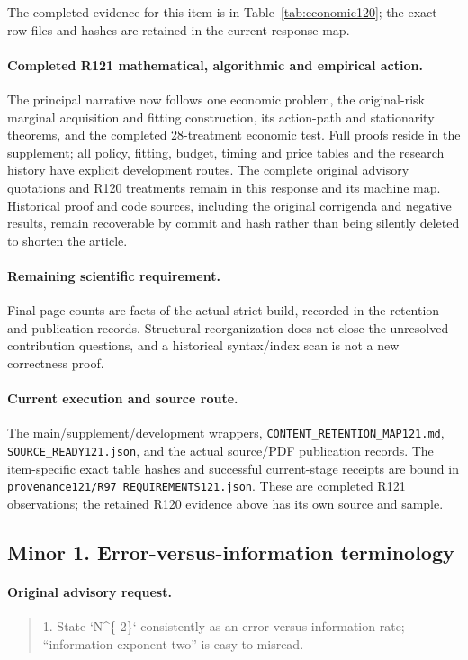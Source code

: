 The completed evidence for this item is in Table~\ref{tab:economic120}; the exact row files and hashes are retained in the current response map.

\paragraph{Completed R121 mathematical, algorithmic and empirical action.}
The principal narrative now follows one economic problem, the original-risk marginal acquisition and fitting construction, its action-path and stationarity theorems, and the completed 28-treatment economic test. Full proofs reside in the supplement; all policy, fitting, budget, timing and price tables and the research history have explicit development routes. The complete original advisory quotations and R120 treatments remain in this response and its machine map. Historical proof and code sources, including the original corrigenda and negative results, remain recoverable by commit and hash rather than being silently deleted to shorten the article.

\paragraph{Remaining scientific requirement.}
Final page counts are facts of the actual strict build, recorded in the retention and publication records. Structural reorganization does not close the unresolved contribution questions, and a historical syntax/index scan is not a new correctness proof.

\paragraph{Current execution and source route.}
The main/supplement/development wrappers, \nolinkurl{CONTENT_RETENTION_MAP121.md}, \nolinkurl{SOURCE_READY121.json}, and the actual source/PDF publication records.
The item-specific exact table hashes and successful current-stage receipts are bound in \nolinkurl{provenance121/R97_REQUIREMENTS121.json}. These are completed R121 observations; the retained R120 evidence above has its own source and sample.

\subsection{Minor 1. Error-versus-information terminology}
\label{response121:minor-1}

\paragraph{Original advisory request.}
\begin{quote}
1. State `N\textasciicircum{}\{-2\}` consistently as an error-versus-information rate; “information exponent two” is easy to misread.
\end{quote}


